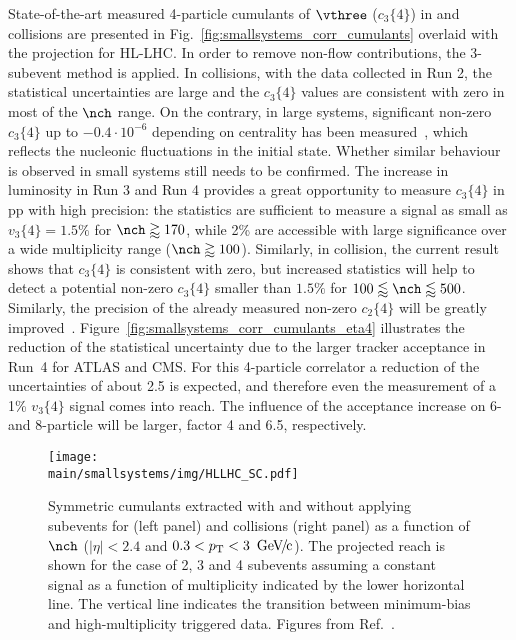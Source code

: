 \documentclass[../report.tex]{subfiles}
\providecommand{\main}{..}
\begin{document}
State-of-the-art measured 4-particle cumulants of $\vthree$ ($c_3\{4\}$) in \pp and \pPb collisions are presented in Fig.~\ref{fig:smallsystems_corr_cumulants} overlaid with the projection for HL-LHC.
In order to remove non-flow contributions, the 3-subevent method is applied. In \pp collisions, with the data collected in Run 2, the statistical uncertainties are large and the $c_3\{4\}$ values are consistent with zero in most of the $\nch$ range. On the contrary, in large systems, significant non-zero $c_3\{4\}$ up to $-0.4 \cdot 10^{-6}$ depending on centrality has been measured~\cite{Aad:2014vba}, which reflects the nucleonic fluctuations in the initial state. Whether similar behaviour is observed in small systems still needs to be confirmed. The increase in luminosity in Run 3 and Run 4 provides a great opportunity to measure $c_3\{4\}$ in pp with high precision: the statistics are sufficient to measure a signal as small as $v_3\{4\} = 1.5\%$ for $\nch \gtrapprox 170$, while 2\% are accessible with large significance over a wide multiplicity range ($\nch \gtrapprox 100$). Similarly, in \pPb collision, the current result shows that $c_3\{4\}$ is consistent with zero, but increased statistics will help to detect a potential non-zero $c_3\{4\}$ smaller than $1.5\%$ for $100 \lessapprox \nch \lessapprox 500$. Similarly, the precision of the already measured non-zero $c_2\{4\}$ will be greatly improved~\cite{ATL-PHYS-PUB-2018-014}.
Figure~\ref{fig:smallsystems_corr_cumulants_eta4} illustrates the reduction of the statistical uncertainty due to the larger tracker acceptance in Run~4 for ATLAS and CMS. For this 4-particle correlator a reduction of the uncertainties of about 2.5 is expected, and therefore even the measurement of a 1\% $v_3\{4\}$ signal comes into reach. The influence of the acceptance increase on 6- and 8-particle will be larger, factor 4 and 6.5, respectively.

\begin{figure}[t!]
\centering
\texttt{[image: \\main/smallsystems/img/HLLHC\_SC.pdf]}
\caption{Symmetric cumulants extracted with and without applying subevents for \pp (left panel) and \pPb collisions (right panel) as a function of $\nch$ ($|\eta| < 2.4$ and $0.3 < \pT < \unit[3]{\UGeVc}$). The projected reach is shown for the case of 2, 3 and 4 subevents assuming a constant signal as a function of multiplicity indicated by the lower horizontal line. The vertical line indicates the transition between minimum-bias and high-multiplicity triggered data. Figures from Ref.~\cite{CMS-PAS-FTR-18-026}.}
\label{fig:smallsystems_corr_symmetriccumulants}
\end{figure}
\end{document}
